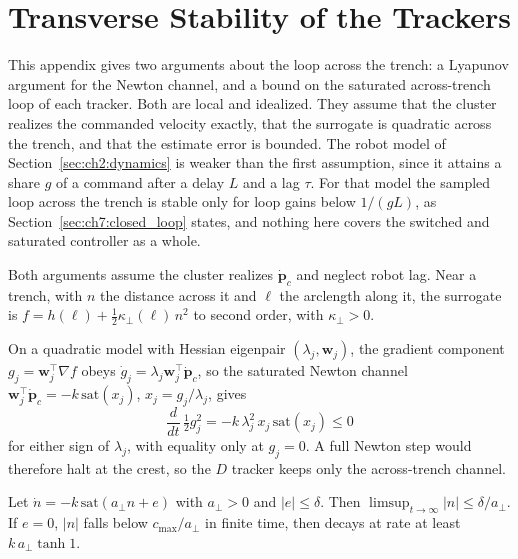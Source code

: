\chapter{Transverse Stability of the Trackers}
\label{app:stability}

This appendix gives two arguments about the loop across the trench: a
Lyapunov argument for the Newton channel, and a bound on the saturated
across-trench loop of each tracker. Both are local and idealized. They
assume that the cluster realizes the commanded velocity exactly, that the
surrogate is quadratic across the trench, and that the estimate error is
bounded. The robot model of Section~\ref{sec:ch2:dynamics} is weaker than
the first assumption, since it attains a share $g$ of a command after a
delay $L$ and a lag $\tau$. For that model the sampled loop across the
trench is stable only for loop gains below $1/(gL)$, as
Section~\ref{sec:ch7:closed_loop} states, and nothing here covers the
switched and saturated controller as a whole.

Both arguments assume the cluster realizes $\dot{\mathbf{p}}_c$
\cite{54,3} and neglect robot lag. Near a trench, with $n$ the distance
across it and $\ell$ the arclength along it, the surrogate is
$f = h(\ell) + \tfrac{1}{2}\kappa_\perp(\ell)\,n^2$ to second order, with
$\kappa_\perp > 0$.

On a quadratic model with Hessian eigenpair $(\lambda_j, \mathbf{w}_j)$,
the gradient component $g_j = \mathbf{w}_j^\top\nabla f$ obeys
$\dot{g}_j = \lambda_j\mathbf{w}_j^\top\dot{\mathbf{p}}_c$, so the
saturated Newton channel
$\mathbf{w}_j^\top\dot{\mathbf{p}}_c = -k\,\mathrm{sat}(x_j)$,
$x_j = g_j/\lambda_j$, gives
\begin{equation}
    \frac{d}{dt}\,\tfrac{1}{2}g_j^2
    = -k\,\lambda_j^2\,x_j\,\mathrm{sat}(x_j) \leq 0
    \label{eq:appE:newton_lyap}
\end{equation}
for either sign of $\lambda_j$, with equality only at $g_j = 0$. A full
Newton step would therefore halt at the crest, so the $D$ tracker keeps
only the across-trench channel.

\begin{proposition}
Let $\dot{n} = -k\,\mathrm{sat}(a_\perp n + e)$ with $a_\perp > 0$ and
$|e| \leq \delta$. Then $\limsup_{t\to\infty}|n| \leq \delta/a_\perp$.
If $e = 0$, $|n|$ falls below $c_{\max}/a_\perp$ in finite time, then
decays at rate at least $k\,a_\perp\tanh 1$.
\end{proposition}

